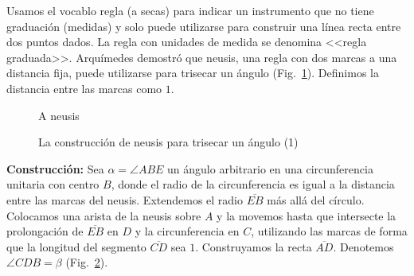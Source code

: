 Usamos el vocablo regla (a secas) para indicar un instrumento que no tiene graduación (medidas) y solo puede utilizarse para construir una línea recta entre dos puntos dados. La regla con unidades de medida se denomina <<regla graduada>>. Arquímedes demostró que neusis, una regla con dos marcas a una distancia fija, puede utilizarse para trisecar un ángulo (Fig.~\ref{f.neusis}). Definimos la distancia entre las marcas como $1$.

\begin{figure}[b]
\begin{center}
\end{center}
\caption{A neusis}\label{f.neusis}
\end{figure}

\begin{figure}[t]
\begin{center}
\end{center}
\caption{La construcción de neusis para trisecar un ángulo (1)}\label{f.trisect-neusis-1}
\end{figure}

\noindent\textbf{Construcción:}
Sea $\alpha=\angle ABE$ un ángulo arbitrario en una circunferencia unitaria con centro $B$, donde el radio de la circunferencia es igual a la distancia entre las marcas del neusis. Extendemos el radio $\overline{EB}$ más allá del círculo. Colocamos una arista de la neusis sobre $A$ y la movemos hasta que intersecte la prolongación de $\overline{EB}$ en $D$ y la circunferencia en $C$, utilizando las marcas de forma que la longitud del segmento $\overline{CD}$ sea $1$. Construyamos la recta $\overline{AD}$. Denotemos $\angle CDB=\beta$ (Fig.~\ref{f.trisect-neusis-1}).

